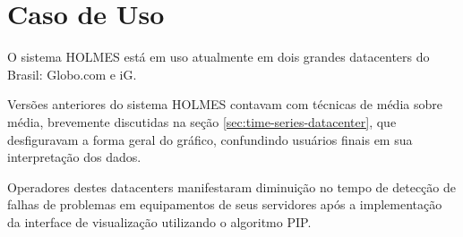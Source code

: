 \section{Caso de Uso}
O sistema HOLMES está em uso atualmente em dois grandes datacenters do Brasil: Globo.com e iG.

Versões anteriores do sistema HOLMES contavam com técnicas de média sobre média, brevemente discutidas na seção \ref{sec:time-series-datacenter}, que desfiguravam a forma geral do gráfico, confundindo usuários finais em sua interpretação dos dados.

Operadores destes datacenters manifestaram diminuição no tempo de detecção de falhas de problemas em equipamentos de seus servidores após a implementação da interface de visualização utilizando o algoritmo PIP.
